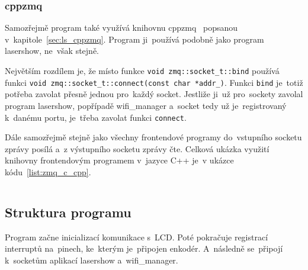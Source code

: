 \subsubsection{cppzmq}
Samozřejmě program také využívá knihovnu cppzmq~\cite{cppzmq} popsanou v~kapitole~\ref{sec:ls_cppzmq}. Program ji~používá podobně jako program lasershow, ne~však stejně.

Největším rozdílem je, že místo funkce \texttt{void zmq::socket_t::bind} používá funkci \texttt{void zmq::socket_t::connect(const char *addr_)}.
Funkci \texttt{bind} je~totiž potřeba zavolat přesně jednou pro~každý socket.
Jestliže ji~už pro~sockety zavolal program lasershow, popřípadě wifi\_manager a~socket tedy už je~registrovaný k~danému portu, je~třeba zavolat funkci \texttt{connect}.

Dále samozřejmě stejně jako všechny frontendové programy do~vstupního socketu zprávy posílá a~z výstupního socketu zprávy čte. Celková ukázka využití knihovny frontendovým programem v~jazyce C++ je~v ukázce kódu~\ref{list:zmq_c_cpp}.

\begin{code}
    \inputminted[frame=lines,fontsize=\footnotesize{}, linenos, breaklines]{cpp}{code_examples/zmq_client.cpp}
\end{code}

\subsection{Struktura programu}
Program začne inicializací komunikace s~LCD.
Poté pokračuje registrací interruptů na~pinech, ke~kterým je~připojen enkodér. A~následně se~připojí k~socketům aplikací lasershow a~wifi\_manager.


